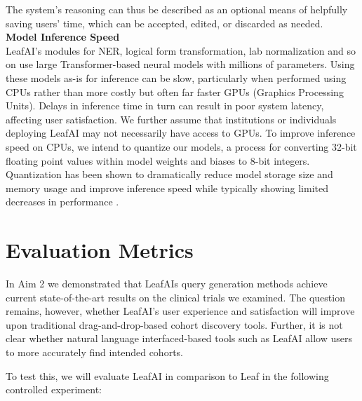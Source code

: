 \documentclass[../main.tex]{subfiles}
\begin{document}
The system's reasoning can thus be described as an optional means of helpfully saving users' time, which can be accepted, edited, or discarded as needed. \\

\noindent \textbf{Model Inference Speed} \\
LeafAI's modules for NER, logical form transformation, lab normalization and so on use large Transformer-based neural models \cite{vaswani2017attention} with millions of parameters. Using these models as-is for inference can be slow, particularly when performed using CPUs rather than more costly but often far faster GPUs (Graphics Processing Units). Delays in inference time in turn can result in poor system latency, affecting user satisfaction. We further assume that institutions or individuals deploying LeafAI may not necessarily have access to GPUs. To improve inference speed on CPUs, we intend to quantize our models, a process for converting 32-bit floating point values within model weights and biases to 8-bit integers. Quantization has been shown to dramatically reduce model storage size and memory usage and improve inference speed while typically showing limited decreases in performance \cite{hubara2017quantized}. 

\section{Evaluation Metrics}

In Aim 2 we demonstrated that LeafAIs query generation methods achieve current state-of-the-art results on the clinical trials we examined. The question remains, however, whether LeafAI's user experience and satisfaction will improve upon traditional drag-and-drop-based cohort discovery tools. Further, it is not clear whether natural language interfaced-based tools such as LeafAI allow users to more accurately find intended cohorts.

To test this, we will evaluate LeafAI in comparison to Leaf in the following controlled experiment: 
\end{document}
